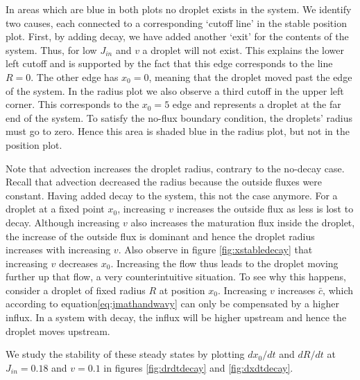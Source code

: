 \documentclass{Dissertate}
\begin{document}
In areas which are blue in both plots no droplet exists in the system.
We identify two causes, each connected to a corresponding `cutoff line'
in the stable position plot. First, by adding decay, we have added
another `exit' for the contents of the system. Thus, for low \(J_{in}\)
and \(v\) a droplet will not exist. This explains the lower left cutoff and
is supported by the fact that this edge corresponds to the line \(R=0\).
The other edge has \(x_0=0\), meaning that the droplet moved past the
edge of the system. In the radius plot we also observe a third cutoff in
the upper left corner. This corresponds to the \(x_0=5\) edge and
represents a droplet at the far end of the system. To satisfy the
no-flux boundary condition, the droplets' radius must go to zero. Hence
this area is shaded blue in the radius plot, but not in the position
plot.

Note that advection increases the droplet radius, contrary to the
no-decay case. Recall that advection decreased the radius because the
outside fluxes were constant. Having added decay to the system, this not
the case anymore. For a droplet at a fixed point \(x_0\), increasing
\(v\) increases the outside flux as less is lost to decay. Although
increasing \(v\) also increases the maturation flux inside the droplet,
the increase of the outside flux is dominant and hence the droplet
radius increases with increasing \(v\). Also observe in figure
\ref{fig:xstabledecay} that increasing \(v\) decreases \(x_0\).
Increasing the flow thus leads to the droplet moving further up that
flow, a very counterintuitive situation. To see why this happens,
consider a droplet of fixed radius \(R\) at position \(x_0\).
Increasing \(v\) increases \(\bar{c}\), which according to equation\ref{eq:jmathandwavy} can only be compensated by a higher influx. In a system with decay, the influx will be higher upstream and hence the droplet moves upstream.

We study the stability of these steady states by plotting \(dx_0/dt\)
and \(dR/dt\) at \(J_{in} = 0.18\) and \(v=0.1\) in figures
\ref{fig:drdtdecay} and \ref{fig:dxdtdecay}.
\end{document}
